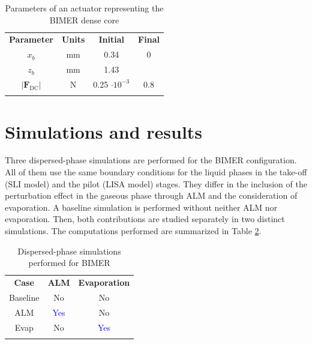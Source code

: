 \begin{table}[!h]
\centering
\caption{Parameters of an actuator representing the BIMER dense core}
\begin{tabular}{cccc}
\thickhline
\textbf{Parameter} & \textbf{Units} & \textbf{Initial} &  \textbf{Final} \\
\thickhline
$x_b$ & mm & 0.34 & 0 \\
$z_b$ & mm & 1.43 &  \\
$| \textbf{F}_\mathrm{DC} |$ & N & 0.25 $\cdot 10 ^{-3}$ & 0.8 \\
\thickhline
\end{tabular}
\label{tab:BIMER_lgs_ALM_parameters}
\end{table}



\section{Simulations and results}

Three dispersed-phase simulations are performed for the BIMER configuration. All of them use the same boundary conditions for the liquid phases in the take-off (SLI model) and the pilot (LISA model) stages. They differ in the inclusion of the perturbation effect in the gaseous phase through ALM and the consideration of evaporation. A baseline simulation is performed without neither ALM nor evaporation. Then, both contributions are studied separately in two distinct simulations. The computations performed are summarized in Table \ref{tab:BIMER_dispersed_phase_simulations_performed}.

\begin{table}[!h]
\centering
\caption{Dispersed-phase simulations performed for BIMER}
\begin{tabular}{ccc}
\thickhline
\textbf{Case} & \textbf{ALM} & \textbf{Evaporation} \\
\thickhline
Baseline & No & No \\
ALM & \textcolor{blue}{Yes} & No \\
Evap & No & \textcolor{blue}{Yes} \\
\thickhline
\end{tabular}
\label{tab:BIMER_dispersed_phase_simulations_performed}
\end{table}


